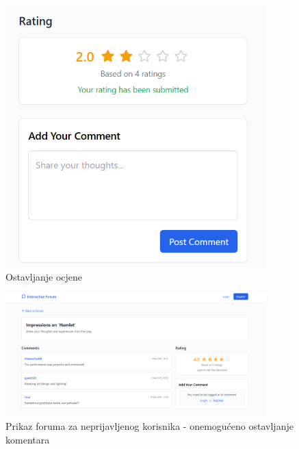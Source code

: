 \begin{figure}[H]
    \centering
    \includegraphics[width=0.9\textwidth]{Slike/fz4.4.png}
    \caption{Ostavljanje ocjene}
    \label{fig:fz4.4}
\end{figure}

\begin{figure}[H]
    \centering
    \includegraphics[width=0.9\textwidth]{Slike/fz4.5.png}
    \caption{Prikaz foruma za neprijavljenog korisnika - onemogućeno ostavljanje komentara}
    \label{fig:fz4.5}
\end{figure}

